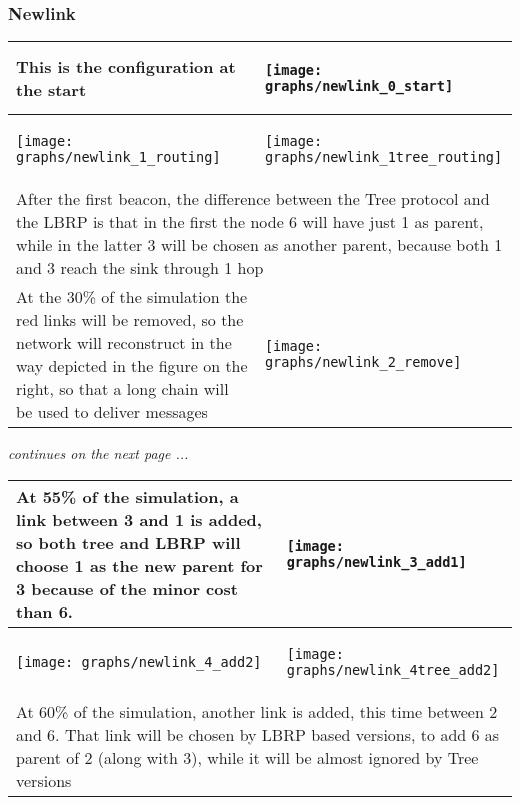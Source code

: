 \documentclass{article}
\begin{document}
\subsubsection{Newlink}
	\bigskip
	\bigskip
	\begin{table}[H]
		\centering
		\begin{tabular}{*{2}{m{}}}
			\hline
			\small This is the configuration at the start&\begin{center}\texttt{[image: graphs/newlink\_0\_start]}\end{center}\\
			\hline
			\begin{center}\texttt{[image: graphs/newlink\_1\_routing]}\end{center}&\begin{center}\texttt{[image: graphs/newlink\_1tree\_routing]}\end{center}\\
			\multicolumn{2}{p{12cm}}{\small After the first beacon, the difference between the Tree protocol and the LBRP is that in the first the node 6 will have just 1 as parent, while in the latter 3 will be chosen as another parent, because both 1 and 3 reach the sink through 1 hop}\\
			\hline
			\small At the 30\% of the simulation the red links will be removed, so the network will reconstruct in the way depicted in the figure on the right, so that a long chain will be used to deliver messages&\begin{center}\texttt{[image: graphs/newlink\_2\_remove]}\end{center}\\
			\hline
		\end{tabular}
		\label{tab:newlinkIndepthP1}
	\end{table}
	\begin{center}
	\small \textit{continues on the next page ...}
	\end{center}
	\clearpage
	\begin{table}[H]
		\centering
		\begin{tabular}{*{2}{m{}}}
			\hline
			\small At 55\% of the simulation, a link between 3 and 1 is added, so both tree and LBRP will choose 1 as the new parent for 3 because of the minor cost than 6.&\begin{center}\texttt{[image: graphs/newlink\_3\_add1]}\end{center}\\
			\hline
			\begin{center}\texttt{[image: graphs/newlink\_4\_add2]}\end{center}&\begin{center}\texttt{[image: graphs/newlink\_4tree\_add2]}\end{center}\\
			\multicolumn{2}{p{12cm}}{\small At 60\% of the simulation, another link is added, this time between 2 and 6. That link will be chosen by LBRP based versions, to add 6 as parent of 2 (along with 3), while it will be almost ignored by Tree versions}\\
			\hline
		\end{tabular}
		\label{tab:newlinkIndepthP2}
	\end{table}
\end{document}
